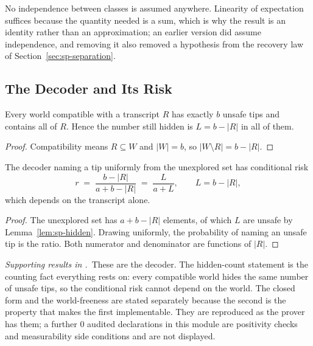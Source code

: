 No independence between classes is assumed anywhere. Linearity of expectation suffices because
the quantity needed is a sum, which is why the result is an identity rather than an
approximation; an earlier version did assume independence, and removing it also removed a
hypothesis from the recovery law of Section~\ref{sec:sp-separation}.

\subsection{The Decoder and Its Risk}
\label{sec:sp-decoder}

\begin{lemma}
\label{lem:sp-hidden}
Every world compatible with a transcript $R$ has exactly $b$ unsafe tips and contains all of
$R$. Hence the number still hidden is $L=b-|R|$ in all of them.
\end{lemma}

\begin{proof}
Compatibility means $R\subseteq W$ and $|W|=b$, so $|W\setminus R|=b-|R|$.
\end{proof}


\begin{theorem}
\label{thm:sp-equivariant}
The decoder naming a tip uniformly from the unexplored set has conditional risk
\begin{equation}
r\;=\;\frac{b-|R|}{a+b-|R|}\;=\;\frac{L}{a+L},
\qquad L=b-|R|,
\label{eq:sp-decoder}
\end{equation}
which depends on the transcript alone.
\end{theorem}

\begin{proof}
The unexplored set has $a+b-|R|$ elements, of which $L$ are unsafe by
Lemma~\ref{lem:sp-hidden}. Drawing uniformly, the probability of naming an unsafe tip is the
ratio. Both numerator and denominator are functions of $|R|$.
\end{proof}


\noindent\emph{Supporting results in .}~These are the decoder. The hidden-count statement is the counting fact everything rests on: every compatible world hides the same number of unsafe tips, so the conditional risk cannot depend on the world. The closed form and the world-freeness are stated separately because the second is the property that makes the first implementable. They are reproduced as the prover has them; a further $0$ audited declarations in this module are positivity checks and measurability side conditions and are not displayed.

